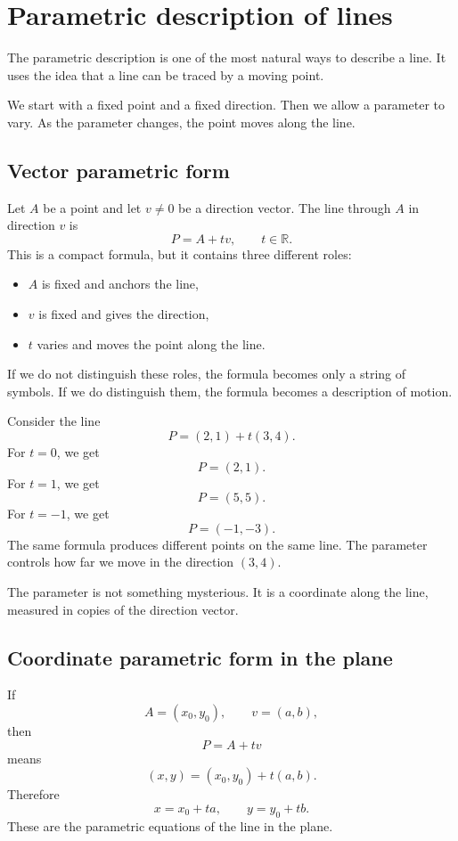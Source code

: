 \section{Parametric description of lines}

The parametric description is one of the most natural ways to describe a line. It uses the idea that a line can be traced by a moving point.

We start with a fixed point and a fixed direction. Then we allow a parameter to vary. As the parameter changes, the point moves along the line.

\subsection*{Vector parametric form}

Let \(A\) be a point and let \(v\ne0\) be a direction vector. The line through \(A\) in direction \(v\) is
\[
P=A+t v,
\qquad t\in\mathbb{R}.
\]
This is a compact formula, but it contains three different roles:
\begin{itemize}
\item \(A\) is fixed and anchors the line,
\item \(v\) is fixed and gives the direction,
\item \(t\) varies and moves the point along the line.
\end{itemize}

If we do not distinguish these roles, the formula becomes only a string of symbols. If we do distinguish them, the formula becomes a description of motion.

\begin{examplebox}
Consider the line
\[
P=(2,1)+t(3,4).
\]
For \(t=0\), we get
\[
P=(2,1).
\]
For \(t=1\), we get
\[
P=(5,5).
\]
For \(t=-1\), we get
\[
P=(-1,-3).
\]
The same formula produces different points on the same line. The parameter controls how far we move in the direction \((3,4)\).
\end{examplebox}

The parameter is not something mysterious. It is a coordinate along the line, measured in copies of the direction vector.

\subsection*{Coordinate parametric form in the plane}

If
\[
A=(x_0,y_0),
\qquad
v=(a,b),
\]
then
\[
P=A+t v
\]
means
\[
(x,y)=(x_0,y_0)+t(a,b).
\]
Therefore
\[
x=x_0+ta,
\qquad
y=y_0+tb.
\]
These are the parametric equations of the line in the plane.

